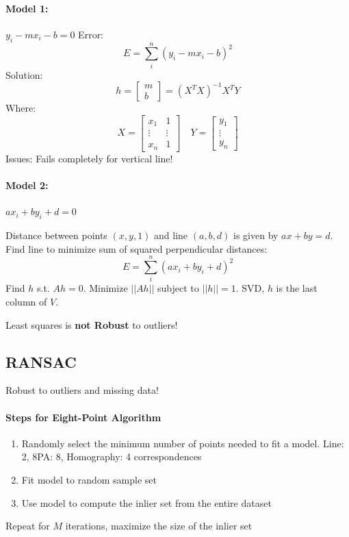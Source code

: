 \documentclass[8pt, a4paper, landscape, includeheadfoot]{extarticle}
\begin{document}
\begin{multicols*}{4}
	\paragraph{Model 1:} $y_i - mx_i -b = 0$
	Error:
	$$
		E = \sum_{i}^{n}\left(y_i - mx_i -b \right)^2
	$$
	Solution:
	$$
		h = \begin{bmatrix}
			m \\b
		\end{bmatrix} = (X^T X)^{-1}X^T Y
	$$
	Where:
	$$
		X = \begin{bmatrix}
			x_1    & 1      \\
			\vdots & \vdots \\
			x_n    & 1
		\end{bmatrix} \quad Y = \begin{bmatrix}
			y_1 \\ \vdots \\ y_n
		\end{bmatrix}
	$$
	Issues: Fails completely for vertical line!

	\paragraph{Model 2:} $ax_i + b y_i + d = 0$

	Distance between points $(x, y, 1)$ and line $(a, b, d)$ is given by $ax + by = d$. Find line to minimize sum of squared perpendicular distances:
	$$
		E = \sum_{i}^{n}\left(ax_i + by_i + d \right)^2
	$$
	Find $h$ s.t. $Ah = 0$. Minimize $||Ah||$ subject to $||h|| = 1$. SVD, $h$ is the last column of $V$.

	Least squares is \textbf{not Robust} to outliers!

	\subsection{RANSAC}
	Robust to outliers and missing data!

	\paragraph{Steps for Eight-Point Algorithm}
	\begin{enumerate}[itemsep=0pt, leftmargin=8pt]
		\item Randomly select the minimum number of points needed to fit a model. Line: 2, 8PA: 8, Homography: 4 correspondences
		\item Fit model to random sample set
		\item Use model to compute the inlier set from the entire dataset
	\end{enumerate}
	Repeat for $M$ iterations, maximize the size of the inlier set


\end{multicols*}
\end{document}
